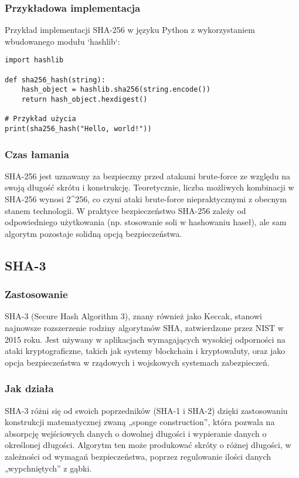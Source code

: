 \documentclass[12pt,a4paper]{article}
\begin{document}
\subsubsection{Przykładowa implementacja}
Przykład implementacji SHA-256 w języku Python z wykorzystaniem wbudowanego modułu `hashlib`:

\begin{verbatim}
import hashlib

def sha256_hash(string):
    hash_object = hashlib.sha256(string.encode())
    return hash_object.hexdigest()

# Przykład użycia
print(sha256_hash("Hello, world!"))
\end{verbatim}

\subsubsection{Czas łamania}
SHA-256 jest uznawany za bezpieczny przed atakami brute-force ze względu na swoją długość skrótu i konstrukcję. Teoretycznie, liczba możliwych kombinacji w SHA-256 wynosi 2^256, co czyni ataki brute-force niepraktycznymi z obecnym stanem technologii. W praktyce bezpieczeństwo SHA-256 zależy od odpowiedniego użytkowania (np. stosowanie soli w hashowaniu haseł), ale sam algorytm pozostaje solidną opcją bezpieczeństwa.


\subsection{SHA-3}
\subsubsection{Zastosowanie}
SHA-3 (Secure Hash Algorithm 3), znany również jako Keccak, stanowi najnowsze rozszerzenie rodziny algorytmów SHA, zatwierdzone przez NIST w 2015 roku. Jest używany w aplikacjach wymagających wysokiej odporności na ataki kryptograficzne, takich jak systemy blockchain i kryptowaluty, oraz jako opcja bezpieczeństwa w rządowych i wojskowych systemach zabezpieczeń.

\subsubsection{Jak działa}
SHA-3 różni się od swoich poprzedników (SHA-1 i SHA-2) dzięki zastosowaniu konstrukcji matematycznej zwaną „sponge construction”, która pozwala na absorpcję wejściowych danych o dowolnej długości i wypieranie danych o określonej długości. Algorytm ten może produkować skróty o różnej długości, w zależności od wymagań bezpieczeństwa, poprzez regulowanie ilości danych „wypchniętych” z gąbki.
\end{document}
